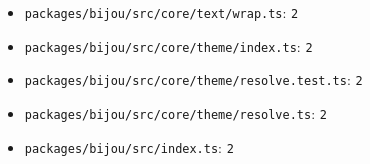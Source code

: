 \begin{itemize}
\item
  \texttt{p\allowbreak{}a\allowbreak{}c\allowbreak{}k\allowbreak{}a\allowbreak{}g\allowbreak{}e\allowbreak{}s\allowbreak{}/\allowbreak{}b\allowbreak{}i\allowbreak{}j\allowbreak{}o\allowbreak{}u\allowbreak{}/\allowbreak{}s\allowbreak{}r\allowbreak{}c\allowbreak{}/\allowbreak{}c\allowbreak{}o\allowbreak{}r\allowbreak{}e\allowbreak{}/\allowbreak{}t\allowbreak{}e\allowbreak{}x\allowbreak{}t\allowbreak{}/\allowbreak{}w\allowbreak{}r\allowbreak{}a\allowbreak{}p\allowbreak{}.\allowbreak{}t\allowbreak{}s}: \texttt{2}
\item
  \texttt{p\allowbreak{}a\allowbreak{}c\allowbreak{}k\allowbreak{}a\allowbreak{}g\allowbreak{}e\allowbreak{}s\allowbreak{}/\allowbreak{}b\allowbreak{}i\allowbreak{}j\allowbreak{}o\allowbreak{}u\allowbreak{}/\allowbreak{}s\allowbreak{}r\allowbreak{}c\allowbreak{}/\allowbreak{}c\allowbreak{}o\allowbreak{}r\allowbreak{}e\allowbreak{}/\allowbreak{}t\allowbreak{}h\allowbreak{}e\allowbreak{}m\allowbreak{}e\allowbreak{}/\allowbreak{}i\allowbreak{}n\allowbreak{}d\allowbreak{}e\allowbreak{}x\allowbreak{}.\allowbreak{}t\allowbreak{}s}: \texttt{2}
\item
  \texttt{p\allowbreak{}a\allowbreak{}c\allowbreak{}k\allowbreak{}a\allowbreak{}g\allowbreak{}e\allowbreak{}s\allowbreak{}/\allowbreak{}b\allowbreak{}i\allowbreak{}j\allowbreak{}o\allowbreak{}u\allowbreak{}/\allowbreak{}s\allowbreak{}r\allowbreak{}c\allowbreak{}/\allowbreak{}c\allowbreak{}o\allowbreak{}r\allowbreak{}e\allowbreak{}/\allowbreak{}t\allowbreak{}h\allowbreak{}e\allowbreak{}m\allowbreak{}e\allowbreak{}/\allowbreak{}r\allowbreak{}e\allowbreak{}s\allowbreak{}o\allowbreak{}l\allowbreak{}v\allowbreak{}e\allowbreak{}.\allowbreak{}t\allowbreak{}e\allowbreak{}s\allowbreak{}t\allowbreak{}.\allowbreak{}t\allowbreak{}s}: \texttt{2}
\item
  \texttt{p\allowbreak{}a\allowbreak{}c\allowbreak{}k\allowbreak{}a\allowbreak{}g\allowbreak{}e\allowbreak{}s\allowbreak{}/\allowbreak{}b\allowbreak{}i\allowbreak{}j\allowbreak{}o\allowbreak{}u\allowbreak{}/\allowbreak{}s\allowbreak{}r\allowbreak{}c\allowbreak{}/\allowbreak{}c\allowbreak{}o\allowbreak{}r\allowbreak{}e\allowbreak{}/\allowbreak{}t\allowbreak{}h\allowbreak{}e\allowbreak{}m\allowbreak{}e\allowbreak{}/\allowbreak{}r\allowbreak{}e\allowbreak{}s\allowbreak{}o\allowbreak{}l\allowbreak{}v\allowbreak{}e\allowbreak{}.\allowbreak{}t\allowbreak{}s}: \texttt{2}
\item
  \texttt{p\allowbreak{}a\allowbreak{}c\allowbreak{}k\allowbreak{}a\allowbreak{}g\allowbreak{}e\allowbreak{}s\allowbreak{}/\allowbreak{}b\allowbreak{}i\allowbreak{}j\allowbreak{}o\allowbreak{}u\allowbreak{}/\allowbreak{}s\allowbreak{}r\allowbreak{}c\allowbreak{}/\allowbreak{}i\allowbreak{}n\allowbreak{}d\allowbreak{}e\allowbreak{}x\allowbreak{}.\allowbreak{}t\allowbreak{}s}: \texttt{2}

\end{itemize}
